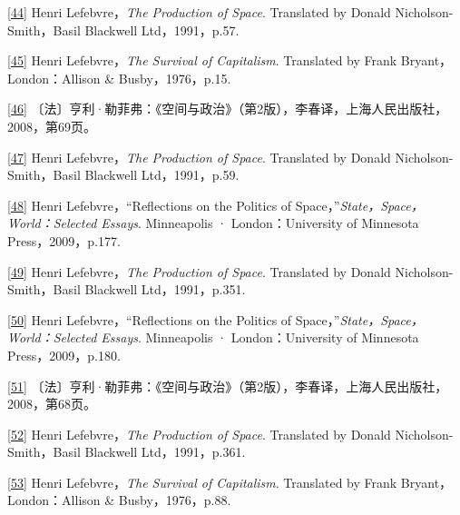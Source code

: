 \documentclass[UTF8, fontset = sourcesans, a4paper, oneside, zihao =
-4, scheme=chinese, no-math, space=true]{ctexbook}
\begin{document}
\protect\hypertarget{part0007_split_004.htmlux5cux23m44}{}{}\protect\hyperlink{part0007_split_003.htmlux5cux23w44}{{[}44{]}}
Henri Lefebvre，\emph{The Production of Space}. Translated by Donald
Nicholson-Smith，Basil Blackwell Ltd，1991，p.57.

\protect\hypertarget{part0007_split_004.htmlux5cux23m45}{}{}\protect\hyperlink{part0007_split_003.htmlux5cux23w45}{{[}45{]}}
Henri Lefebvre，\emph{The Survival of Capitalism}. Translated by Frank
Bryant，London：Allison \& Busby，1976，p.15.

\protect\hypertarget{part0007_split_004.htmlux5cux23m46}{}{}\protect\hyperlink{part0007_split_003.htmlux5cux23w46}{{[}46{]}}
〔法〕亨利·勒菲弗：《空间与政治》（第2版），李春译，上海人民出版社，2008，第69页。

\protect\hypertarget{part0007_split_004.htmlux5cux23m47}{}{}\protect\hyperlink{part0007_split_003.htmlux5cux23w47}{{[}47{]}}
Henri Lefebvre，\emph{The Production of Space}. Translated by Donald
Nicholson-Smith，Basil Blackwell Ltd，1991，p.59.

\protect\hypertarget{part0007_split_004.htmlux5cux23m48}{}{}\protect\hyperlink{part0007_split_003.htmlux5cux23w48}{{[}48{]}}
Henri Lefebvre，``Reflections on the Politics of
Space，''\emph{State，Space，World：Selected Essays}. Minneapolis ·
London：University of Minnesota Press，2009，p.177.

\protect\hypertarget{part0007_split_004.htmlux5cux23m49}{}{}\protect\hyperlink{part0007_split_003.htmlux5cux23w49}{{[}49{]}}
Henri Lefebvre，\emph{The Production of Space}. Translated by Donald
Nicholson-Smith，Basil Blackwell Ltd，1991，p.351.

\protect\hypertarget{part0007_split_004.htmlux5cux23m50}{}{}\protect\hyperlink{part0007_split_003.htmlux5cux23w50}{{[}50{]}}
Henri Lefebvre，``Reflections on the Politics of
Space，''\emph{State，Space，World：Selected Essays}. Minneapolis ·
London：University of Minnesota Press，2009，p.180.

\protect\hypertarget{part0007_split_004.htmlux5cux23m51}{}{}\protect\hyperlink{part0007_split_003.htmlux5cux23w51}{{[}51{]}}
〔法〕亨利·勒菲弗：《空间与政治》（第2版），李春译，上海人民出版社，2008，第68页。

\protect\hypertarget{part0007_split_004.htmlux5cux23m52}{}{}\protect\hyperlink{part0007_split_003.htmlux5cux23w52}{{[}52{]}}
Henri Lefebvre，\emph{The Production of Space}. Translated by Donald
Nicholson-Smith，Basil Blackwell Ltd，1991，p.361.

\protect\hypertarget{part0007_split_004.htmlux5cux23m53}{}{}\protect\hyperlink{part0007_split_003.htmlux5cux23w53}{{[}53{]}}
Henri Lefebvre，\emph{The Survival of Capitalism}. Translated by Frank
Bryant，London：Allison \& Busby，1976，p.88.
\end{document}
